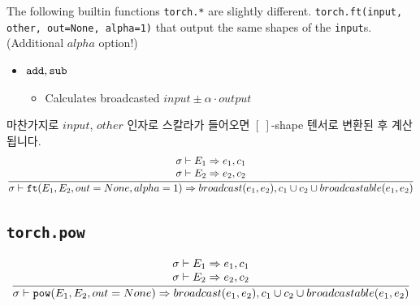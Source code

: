 \documentclass{article}
\begin{document}
The following builtin functions \texttt{torch.*} are slightly different.
\texttt{torch.ft(input, other, out=None, alpha=1)} that output the same shapes
of the \texttt{input}s. (Additional $alpha$ option!)
\begin{itemize}
  \item $\mathtt{add}, \mathtt{sub}$
  \begin{itemize}
    \item Calculates broadcasted $input \pm \alpha \cdot output$
  \end{itemize}
\end{itemize}
마찬가지로 $input$, $other$ 인자로 스칼라가 들어오면 $[\:]$-shape 텐서로 변환된
후 계산됩니다.
\begin{align*}
  \frac
  {
    \begin{array}{l}
      \sigma \vdash E_1 \Rightarrow e_1, c_1 \\
      \sigma \vdash E_2 \Rightarrow e_2, c_2 \\
    \end{array}
  }
  {
    \sigma \vdash \mathtt{ft(}E_1, E_2, out=None, alpha=1\mathtt{)} \Rightarrow
      broadcast(e_1, e_2), c_1 \cup c_2 \cup broadcastable(e_1, e_2)
  }
\end{align*}

\subsection*{\texttt{torch.pow}}
\begin{align*}
  \frac
  {
    \begin{array}{l}
      \sigma \vdash E_1 \Rightarrow e_1, c_1 \\
      \sigma \vdash E_2 \Rightarrow e_2, c_2 \\
    \end{array}
  }
  {
    \sigma \vdash \mathtt{pow(}E_1, E_2, out=None\mathtt{)} \Rightarrow broadcast(e_1, e_2),
      c_1 \cup c_2 \cup broadcastable(e_1, e_2)
  }
\end{align*}
\end{document}
